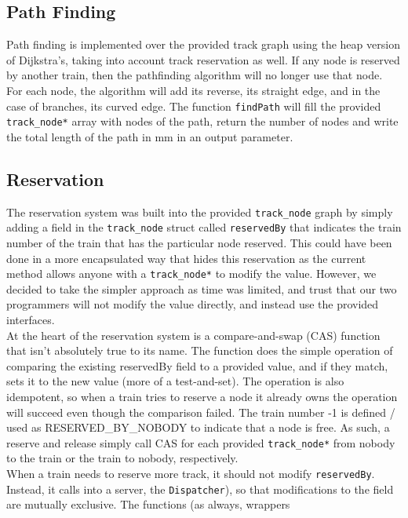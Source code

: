 \documentclass[12pt]{article}
\begin{document}
\subsection{Path Finding}
Path finding is implemented over the provided track graph using the heap version of Dijkstra's, taking into account
track reservation as well. If any node is reserved by another train, then the pathfinding algorithm will no longer use
that node. For each node, the algorithm will add its reverse, its straight edge, and in the case of branches, its curved
edge. The function \texttt{findPath} will fill the provided \texttt{track\_node*} array with nodes of the path, return
the number of nodes and write the total length of the path in mm in an output parameter.
\\[1\baselineskip]
\subsection{Reservation}
The reservation system was built into the provided \texttt{track\_node} graph by simply adding a field in the
\texttt{track\_node} struct called \texttt{reservedBy} that indicates the train number of the train that has the
particular node reserved. This could have been done in a more encapsulated way that hides this reservation as the
current method allows anyone with a \texttt{track\_node*} to modify the value. However, we decided to take the simpler
approach as time was limited, and trust that our two programmers will not modify the value directly, and instead use the
provided interfaces.
\\
At the heart of the reservation system is a compare-and-swap (CAS) function that isn't absolutely true to its name. The
function does the simple operation of comparing the existing reservedBy field to a provided value, and if they match,
sets it to the new value (more of a test-and-set). The operation is also idempotent, so when a train tries to reserve a
node it already owns the operation will succeed even though the comparison failed. The train number -1 is defined / used as
RESERVED\_BY\_NOBODY to indicate that a node is free. As such, a reserve and release simply call CAS for each provided
\texttt{track\_node*} from nobody to the train or the train to nobody, respectively.
\\
When a train needs to reserve more track, it should not modify \texttt{reservedBy}. Instead, it calls into a server,
the \texttt{Dispatcher}), so that modifications to the field are mutually exclusive. The functions (as always, wrappers
\end{document}
